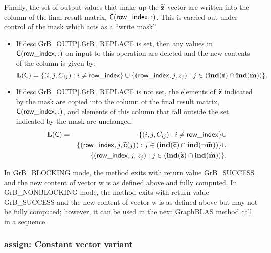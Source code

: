 Finally, the set of output values that make up the ${\bf \widetilde{z}}$ 
vector are written into the column of the final result matrix, ${\sf C}({\sf row\_index},:)$.  
This is carried out under control of the mask which acts as a ``write mask''.
\begin{itemize}
\item If {\sf desc[GrB\_OUTP].GrB\_REPLACE} is set, then any values in ${\sf C}({\sf row\_index},:)$ 
on input to this operation are deleted and the new contents of the column is given by:
\[
\bold{L}({\sf C}) = \{ (i,j,C_{ij}) : i \neq {\sf row\_index} \} \cup \{({\sf row\_index},j,z_{j}) : j \in 
(\bold{ind}({\bf \widetilde{z}}) 
\cap \bold{ind}({\bf \widetilde{m}})) \}. 
\]

\item If {\sf desc[GrB\_OUTP].GrB\_REPLACE} is not set, the elements of 
${\bf \widetilde{z}}$ indicated by the mask are copied into the column 
of the final result matrix, ${\sf C}({\sf row\_index},:)$, and elements of 
this column that fall outside the set indicated by the mask are unchanged:
\begin{eqnarray} 
    \bold{L}({\sf C}) & = & \{ (i,j,C_{ij}) : i \neq {\sf row\_index} \} \cup \nonumber \\
    & & \{({\sf row\_index},j,{\bf \widetilde{c}}(j)) : j \in (\bold{ind}({\bf \widetilde{c}}) 
    \cap \bold{ind}(\neg {\bf \widetilde{m}})) \} \cup \nonumber \\
    & & \{({\sf row\_index},j,z_{j}) : j \in 
    (\bold{ind}({\bf \widetilde{z}}) \cap \bold{ind}({\bf \widetilde{m}})) \}. \nonumber
\end{eqnarray}
\end{itemize}

In {\sf GrB\_BLOCKING} mode, the method exits with return value 
{\sf GrB\_SUCCESS} and the new content of vector {\sf w} is as defined above
and fully computed.  
In {\sf GrB\_NONBLOCKING} mode, the method exits with return value 
{\sf GrB\_SUCCESS} and the new content of vector {\sf w} is as defined above 
but may not be fully computed; however, it can be used in the next GraphBLAS 
method call in a sequence.



\subsubsection{{\sf assign}: Constant vector variant}

